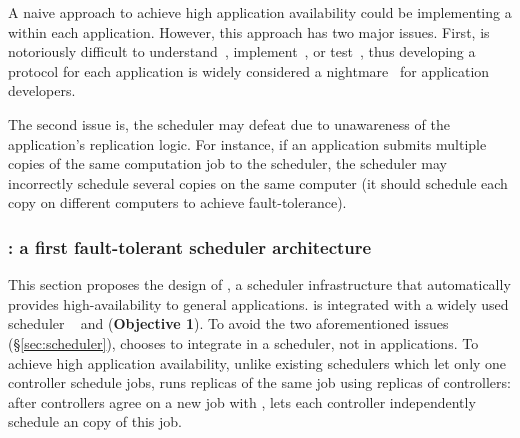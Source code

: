 A naive approach to achieve high application availability could be implementing 
a \paxos within each application. However, this approach has two major issues. 
First, \paxos is notoriously difficult to 
understand~\cite{raft:usenix14,paxos:simple}, implement~\cite{paxos:practical, 
paxos:live}, or test~\cite{modist:nsdi09,demeter:sosp11}, thus developing a 
\paxos protocol for each application is widely considered a 
nightmare~\cite{modist:nsdi09,demeter:sosp11,paxos:live} for application 
developers.

The second issue is, the scheduler may defeat \paxos due to unawareness of the 
application's \paxos replication logic. For instance, if an application submits 
multiple copies of the same computation job to the scheduler, the scheduler may 
incorrectly schedule several copies on the same computer (it should schedule 
each copy on different computers to achieve \paxos fault-tolerance).

\vspace{-.15in}\subsubsection{\tripod: a first fault-tolerant scheduler 
architecture} 
\label{sec:scheduler-arch}\vspace{-.075in}

This section proposes the design of \tripod, a scheduler infrastructure that 
automatically provides high-availability to general applications. \tripod 
is integrated with a widely used scheduler \mesos~\cite{mesos:nsdi11} and 
\falcon (\textbf{Objective 1}). To avoid the two aforementioned issues 
(\S\ref{sec:scheduler}), \tripod chooses 
to integrate \paxos in a scheduler, not in applications. To achieve high
application availability, unlike existing schedulers which let only one 
controller schedule jobs, \tripod runs replicas of the same job using replicas 
of controllers: after controllers agree on a new job with \falcon, \tripod lets 
each controller independently schedule an copy of this job.




